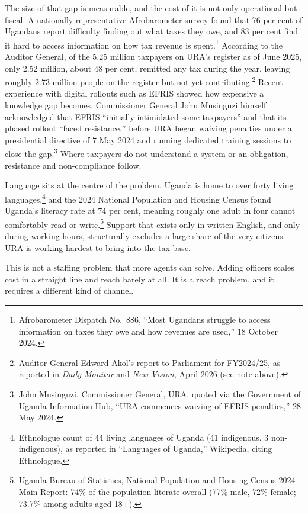 \documentclass[11pt,a4paper]{article}
\begin{document}
The size of that gap is measurable, and the cost of it is not only operational but fiscal. A nationally representative Afrobarometer survey found that 76 per cent of Ugandans report difficulty finding out what taxes they owe, and 83 per cent find it hard to access information on how tax revenue is spent.\footnote{Afrobarometer Dispatch No.\ 886, ``Most Ugandans struggle to access information on taxes they owe and how revenues are used,'' 18 October 2024.} According to the Auditor General, of the 5.25 million taxpayers on URA's register as of June 2025, only 2.52 million, about 48 per cent, remitted any tax during the year, leaving roughly 2.73 million people on the register but not yet contributing.\footnote{Auditor General Edward Akol's report to Parliament for FY2024/25, as reported in \textit{Daily Monitor} and \textit{New Vision}, April 2026 (see note above).} Recent experience with digital rollouts such as EFRIS showed how expensive a knowledge gap becomes. Commissioner General John Musinguzi himself acknowledged that EFRIS ``initially intimidated some taxpayers'' and that its phased rollout ``faced resistance,'' before URA began waiving penalties under a presidential directive of 7 May 2024 and running dedicated training sessions to close the gap.\footnote{John Musinguzi, Commissioner General, URA, quoted via the Government of Uganda Information Hub, ``URA commences waiving of EFRIS penalties,'' 28 May 2024.} Where taxpayers do not understand a system or an obligation, resistance and non-compliance follow.

Language sits at the centre of the problem. Uganda is home to over forty living languages,\footnote{Ethnologue count of 44 living languages of Uganda (41 indigenous, 3 non-indigenous), as reported in ``Languages of Uganda,'' Wikipedia, citing Ethnologue.} and the 2024 National Population and Housing Census found Uganda's literacy rate at 74 per cent, meaning roughly one adult in four cannot comfortably read or write.\footnote{Uganda Bureau of Statistics, National Population and Housing Census 2024 Main Report: 74\% of the population literate overall (77\% male, 72\% female; 73.7\% among adults aged 18+).} Support that exists only in written English, and only during working hours, structurally excludes a large share of the very citizens URA is working hardest to bring into the tax base.

This is not a staffing problem that more agents can solve. Adding officers scales cost in a straight line and reach barely at all. It is a reach problem, and it requires a different kind of channel.
\end{document}

